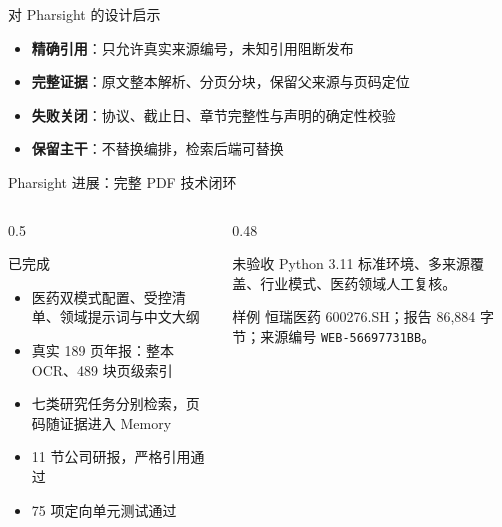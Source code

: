 \documentclass[aspectratio=169,10pt]{ctexbeamer}
\begin{document}
\begin{frame}{对 Pharsight 的设计启示}
\begin{itemize}
  \item \textbf{精确引用}：只允许真实来源编号，未知引用阻断发布
  \item \textbf{完整证据}：原文整本解析、分页分块，保留父来源与页码定位
  \item \textbf{失败关闭}：协议、截止日、章节完整性与声明的确定性校验
  \item \textbf{保留主干}：不替换编排，检索后端可替换
\end{itemize}
\end{frame}

\begin{frame}{Pharsight 进展：完整 PDF 技术闭环}
\begin{columns}[T]
\begin{column}{0.5\textwidth}
\begin{block}{已完成}
\begin{itemize}
  \item 医药双模式配置、受控清单、领域提示词与中文大纲
  \item 真实 189 页年报：整本 OCR、489 块页级索引
  \item 七类研究任务分别检索，页码随证据进入 Memory
  \item 11 节公司研报，严格引用通过
  \item 75 项定向单元测试通过
\end{itemize}
\end{block}
\end{column}
\begin{column}{0.48\textwidth}
\begin{alertblock}{未验收}
Python 3.11 标准环境、多来源覆盖、行业模式、医药领域人工复核。
\end{alertblock}
\begin{exampleblock}{样例}
恒瑞医药 600276.SH；报告 86{,}884 字节；来源编号 \texttt{WEB-56697731BB}。
\end{exampleblock}
\end{column}
\end{columns}
\end{frame}
\end{document}
